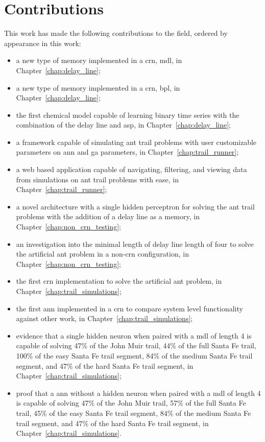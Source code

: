 \section{Contributions}
This work has made the following contributions to the field, ordered by appearance in this work:
\begin{itemize}
\item a new type of memory implemented in a \acrlong{crn}, \acrlong{mdl}, in Chapter~\ref{chap:delay_line};
\item a new type of memory implemented in a \acrlong{crn}, \acrlong{bpl}, in Chapter~\ref{chap:delay_line};
\item the first chemical model capable of learning binary time series with the combination of the delay line and \acrlong{asp}, in Chapter~\ref{chap:delay_line};
\item a framework capable of simulating ant trail problems with user customizable parameters on \acrlong{ann} and \acrlong{ga} parameters, in Chapter~\ref{chap:trail_runner};
\item a web based application capable of navigating, filtering, and viewing data from simulations on ant trail problems with ease, in Chapter~\ref{chap:trail_runner};
\item a novel architecture with a single hidden perceptron for solving the ant trail problems with the addition of a delay line as a memory, in Chapter~\ref{chap:non_crn_testing};
\item an investigation into the minimal length of delay line length of four to solve the artificial ant problem in a non-\acrlong{crn} configuration, in Chapter~\ref{chap:non_crn_testing};
\item the first \acrlong{crn} implementation to solve the artificial ant problem, in Chapter~\ref{chap:trail_simulations};
\item the first \acrlong{ann} implemented in a \acrlong{crn} to compare system level functionality against other work, in Chapter~\ref{chap:trail_simulations};
\item evidence that a single hidden neuron when paired with a \acrlong{mdl} of length 4 is capable of solving 47\% of the John Muir trail, 44\% of the full Santa Fe trail, 100\% of the easy Santa Fe trail segment, 84\% of the medium Santa Fe trail segment, and 47\% of the hard Santa Fe trail segment, in Chapter~\ref{chap:trail_simulations};
\item proof that a \acrlong{ann} without a hidden neuron when paired with a \acrlong{mdl} of length 4 is capable of solving 47\% of the John Muir trail, 57\% of the full Santa Fe trail, 45\% of the easy Santa Fe trail segment, 84\% of the medium Santa Fe trail segment, and 47\% of the hard Santa Fe trail segment, in Chapter~\ref{chap:trail_simulations}.
\end{itemize}

